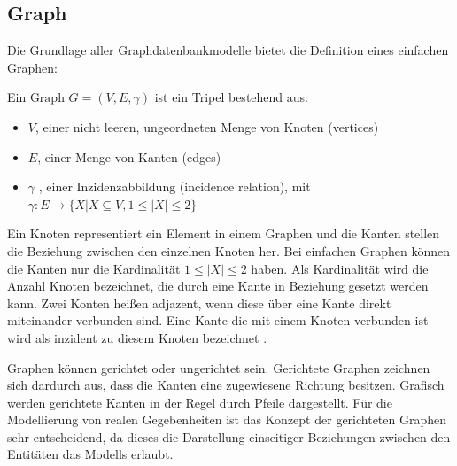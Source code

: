 \subsection{Graph}
Die Grundlage aller Graphdatenbankmodelle bietet die Definition eines einfachen Graphen:
\begin{definition}
	Ein $\text{Graph } G=(V,E,\gamma)$ ist ein Tripel bestehend aus:
	\begin{itemize}
		\item $V$, einer nicht leeren, ungeordneten Menge von Knoten (vertices)
		\item $E$, einer Menge von Kanten (edges)
		\item $\gamma$ , einer Inzidenzabbildung (incidence relation), mit\\
		$\gamma : E \longrightarrow \{X | X \subseteq V, 1 \leq |X| \leq 2\}$
	\end{itemize}\cite[Seite 21]{pbeck01}
\end{definition}
Ein Knoten representiert ein Element in einem Graphen und die Kanten stellen die Beziehung zwischen den einzelnen Knoten her.
Bei einfachen Graphen können die Kanten nur die Kardinalität $1 \leq |X| \leq 2$ haben.
Als Kardinalität wird die Anzahl Knoten bezeichnet, die durch eine Kante in Beziehung gesetzt werden kann.
Zwei Konten heißen adjazent, wenn diese über eine Kante direkt miteinander verbunden sind.
Eine Kante die mit einem Knoten verbunden ist wird als inzident zu diesem Knoten bezeichnet \cite{knauer2015diskrete}.

Graphen können gerichtet oder ungerichtet sein.
Gerichtete Graphen zeichnen sich dardurch aus, dass die Kanten eine zugewiesene Richtung besitzen.
Grafisch werden gerichtete Kanten in der Regel durch Pfeile dargestellt.
Für die Modellierung von realen Gegebenheiten ist das Konzept der gerichteten Graphen sehr entscheidend, da dieses die Darstellung einseitiger Beziehungen zwischen den Entitäten das Modells erlaubt.

